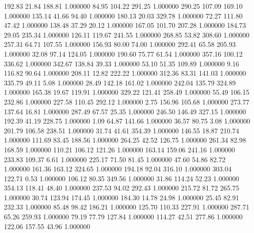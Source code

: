     192.83     21.84    188.81  1.000000
     84.95    104.22    291.25  1.000000
    290.25    107.09    169.10  1.000000
    135.14     41.66     94.40  1.000000
    180.13     20.03    329.78  1.000000
     72.27    111.80     47.42  1.000000
    138.48     37.29     20.12  1.000000
    167.05    101.70    207.28  1.000000
    184.73     29.05    235.34  1.000000
    126.11    119.67    241.55  1.000000
    268.85     53.82    308.60  1.000000
    257.31     64.71    107.55  1.000000
    156.93     80.00     74.00  1.000000
    292.41     65.58    205.93  1.000000
     32.08     97.14    124.05  1.000000
    190.60     75.77     61.54  1.000000
    357.16    100.12    336.62  1.000000
    342.67    138.84     39.33  1.000000
     53.10     51.35    109.89  1.000000
      9.16    116.82     90.64  1.000000
    208.11     12.82    222.22  1.000000
    312.36     83.31    141.03  1.000000
    335.79     49.11      5.08  1.000000
     28.49    142.18    161.02  1.000000
    242.04    135.79    324.89  1.000000
    165.38     19.67    119.91  1.000000
    329.22    121.41    258.49  1.000000
     55.49    106.15    232.86  1.000000
    227.58    110.45    292.12  1.000000
      2.75    156.96    105.68  1.000000
    273.77    137.64     16.81  1.000000
    287.49     67.57     25.35  1.000000
    246.50    146.49    327.15  1.000000
    192.39     41.19    228.75  1.000000
      1.09     64.87    141.66  1.000000
     36.57     80.75      3.08  1.000000
    201.79    106.58    238.51  1.000000
     31.74     41.61    354.39  1.000000
    146.55     18.87    210.74  1.000000
    111.69     83.45    188.56  1.000000
    264.25     42.52    126.75  1.000000
    261.34     82.98    168.59  1.000000
    110.21    106.12    121.26  1.000000
    163.14    159.06    241.16  1.000000
    233.83    109.37      6.61  1.000000
    225.17     71.50     81.45  1.000000
     47.60     54.86     82.72  1.000000
    161.36    163.12    324.65  1.000000
    194.18     92.04    316.10  1.000000
    303.04    122.71      0.53  1.000000
    106.12     80.35    349.56  1.000000
     31.86    114.24     52.23  1.000000
    354.13    118.41     48.40  1.000000
    237.53     94.02    292.43  1.000000
    215.72     81.72    265.75  1.000000
     30.74    123.94    174.45  1.000000
    184.30     14.78     24.98  1.000000
     25.45     82.91    232.33  1.000000
     85.48     98.42    186.21  1.000000
    125.70    110.33    227.91  1.000000
    287.71     65.26    259.93  1.000000
     79.19     77.79    127.84  1.000000
    114.27     42.51    277.86  1.000000
    122.06    157.55     43.96  1.000000
